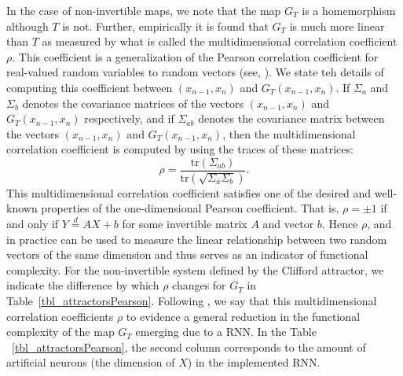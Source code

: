



In the case of non-invertible maps, we note that the map $G_T$ is a homemorphism although $T$ is not. Further, empirically it is found that $G_T$ is much more linear than $T$ as measured by what is called the multidimensional correlation coefficient $\rho$. This coefficient is a generalization of the Pearson correlation coefficient for real-valued random variables to random vectors (see, \cite{puccetti2019measuring}). We state teh details of computing this coefficient between 
$(x_{n-1},x_n)$ and $G_T(x_{n-1},x_n)$. 
If $\Sigma_{a}$ and $\Sigma_{b}$ denotes the covariance matrices of the vectors $(x_{n-1},x_n)$ and $G_T(x_{n-1},x_n)$ respectively, and if $\Sigma_{ab}$ denotes the covariance matrix between the vectors $(x_{n-1},x_n)$ and $G_T(x_{n-1},x_n)$, then the multidimensional correlation coefficient is computed by using the traces of these matrices:
\[
    \rho= \frac{\text{tr}({\Sigma_{ab}})}{\text{tr}({\sqrt{\Sigma_a\Sigma_b}})}.
\]
This multidimensional correlation coefficient satisfies one of the desired and well-known properties of the one-dimensional Pearson coefficient. That is, $\rho=\pm 1$ if and only if $Y\overset{d}{=}AX+b$ for some invertible matrix $A$ and vector $b$. Hence $\rho$, and in practice can be used  to measure the linear relationship between two random vectors of the same dimension and thus serves as an indicator of functional complexity. For the non-invertible system defined by the Clifford attractor, we indicate the difference by which $\rho$ changes for $G_T$ in Table~\ref{tbl_attractorsPearson}.
Following \cite{manjunath2021universal}, we say that this multidimensional correlation coefficients $\rho$ to evidence a general reduction in the functional complexity of the map $G_T$ emerging due to a RNN. In the 
Table ~\ref{tbl_attractorsPearson}, the second column corresponds to the amount of artificial neurons (the dimension of $X$) in the implemented RNN.
               

